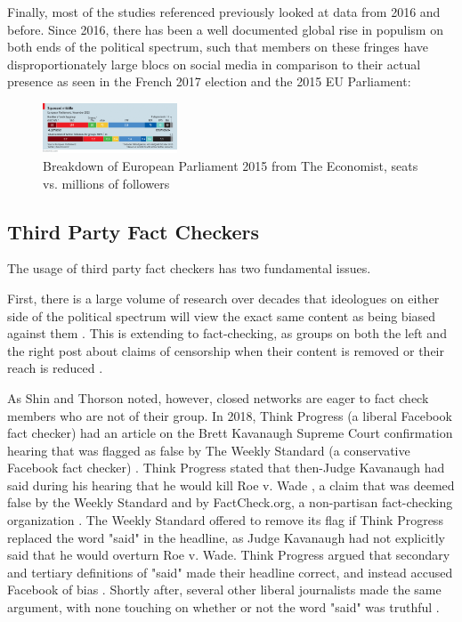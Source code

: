 Finally, most of the studies referenced previously looked at data from 2016 and before. Since 2016, there has been a well documented global rise in populism on both ends of the political spectrum, such that members on these fringes have disproportionately large blocs on social media in comparison to their actual presence as seen in the French 2017 election \citep{donadio2017french,vinocur2017marine} and the 2015 EU Parliament:  \begin{figure}[htp]
    \centering
    \includegraphics[width=4cm]{European Parliament 2015.png}
    \caption{Breakdown of European Parliament 2015 from The Economist, seats vs. millions of followers}
    \label{img:European Parliament 2015}
\end{figure}
 
 \subsection{Third Party Fact Checkers}
 The usage of third party fact checkers has two fundamental issues.
 
 First, there is a large volume of research over decades that ideologues on either side of the political spectrum will view the exact same content as being biased against them \citep{arpan2003experimental,baum2008eye,christen2002hostile,gunther2001predicting,gunther2004mapping,baum2004issue,gussin2004eye,lee2005liberal,vallone1985hostile}. This is extending to fact-checking, as groups on both the left and the right post about claims of censorship when their content is removed or their reach is reduced \citep{Dreyfuss2020Now,Post2020Facebook,Millhiser2018Facebook}. 
 
 As Shin and Thorson noted, however, closed networks are eager to fact check members who are not of their group. In 2018, Think Progress (a liberal Facebook fact checker) had an article on the Brett Kavanaugh Supreme Court confirmation hearing that was flagged as false by The Weekly Standard (a conservative Facebook fact checker) \citep{owen2018with}. Think Progress stated that then-Judge Kavanaugh had said during his hearing that he would kill Roe v. Wade \citep{millhiser2018brett}, a claim that was deemed false by the Weekly Standard and by FactCheck.org, a non-partisan fact-checking organization \citep{gore2018kavanaugh}. The Weekly Standard offered to remove its flag if Think Progress replaced the word "said" in the headline, as Judge Kavanaugh had not explicitly said that he would overturn Roe v. Wade. Think Progress argued that secondary and tertiary definitions of "said" made their headline correct, and instead accused Facebook of bias \citep{legum2018tweet}. Shortly after, several other liberal journalists made the same argument, with none touching on whether or not the word "said" was truthful \citep{froomkin2018tweet,grim2018tweet,beutler2018tweet}. 
 
